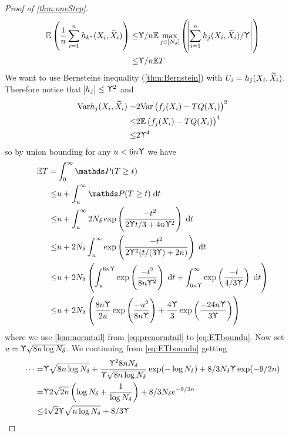 \begin{proof}[Proof of \cref{thm:oneStep}]
  \begin{align}
    \mathbb{E} \left( \frac{1}{n} \sum_{i=1}^n h_{k^*}(X_i, \widetilde{X}_i) \right)
    \leq & \Upupsilon/n \mathbb{E} \max_{j \in [N_\delta]} \left(
    \abs{\sum_{i=1}^n h_j(X_i, \widetilde{X}_i)/\Upupsilon} \right)
    \\ \leq & \Upupsilon/n \mathbb{E} T 
    \label{eq:havgbound}
  \end{align}
  We want to use Bernsteins inequality (\cref{thm:Bernstein}) with
  $U_i = h_j(X_i,\widetilde{X}_i)$. Therefore notice that
  $\abs{h_j} \leq \Upupsilon^2$ and
  \begin{align}
    \mathrm{Var} h_j(X_i, \widetilde{X}_i) = & 2 \mathrm{Var} \left( f_j(X_i) - TQ(X_i) \right)^2
    \\ \leq & 2 \mathbb{E} \left( f_j(X_i) - TQ(X_i) \right)^4
    \\ \leq & 2 \Upupsilon^4
    \label{eq:hvarbound}
  \end{align}
  so by union bounding for any $u < 6 n \Upupsilon$ we have
  \begin{align}
    \E T = & \int_0^\infty \Prob(T \geq t)
    \\ \leq & u + \int_u^\infty \Prob(T \geq t) \difd t
    \\ \leq & u + \int_u^\infty 2 N_\delta
    \exp \left( \frac{-t^2}{2 \Yp t/3 + 4n \Yp^2} \right) \difd t
    \\ \leq & u + 2 N_\delta \int_u^\infty 
    \exp \left( \frac{-t^2}{2 \Yp^2 (t/(3 \Yp) + 2 n )} \right) \difd t
    \\ \leq & u + 2 N_\delta \left(
      \int_u^{6 n \Yp} \exp \left( \frac{-t^2}{8 n \Yp^2} \right) \difd t
      + \int_{6 n \Yp}^\infty \exp \left( \frac{-t}{4/3 \Yp} \right) \difd t
    \right) 
    \label{eq:prenormtail}
    \\ \leq & u + 2 N_\delta \left(
      \frac{8 n \Yp}{2 u} \exp\left( \frac{-u^2}{8 n \Yp} \right)
      + \frac{4 \Yp}{3} \exp\left( \frac{-24 n \Yp}{3 \Yp} \right)
    \right) 
    \label{eq:ETboundu}
  \end{align}
  where we use \cref{lem:normtail}
  from \cref{eq:prenormtail} to \cref{eq:ETboundu}.
  Now set $u = \Upupsilon \sqrt{8 n \log N_\delta}$.
  We continuing from \cref{eq:ETboundu} getting
  \begin{align}
    \dots = & \Yp \sqrt{8 n \log N_\delta}
    + \frac{\Yp^2 8 n N_\delta}{\Yp \sqrt{8 n \log N_\delta}}
    \exp(-\log N_\delta) + 8/3 N_\delta \Yp \exp(-9/2 n)
    \\ = & \Yp 2 \sqrt{2n} \left( \log N_\delta + \frac{1}{\log N_\delta} \right)
    + 8/3 N_\delta e^{-9/2 n}
    \\ \leq & 4 \sqrt{2} \Yp \sqrt{n \log N_\delta} + 8/3 \Yp

\end{align}
\end{proof}
